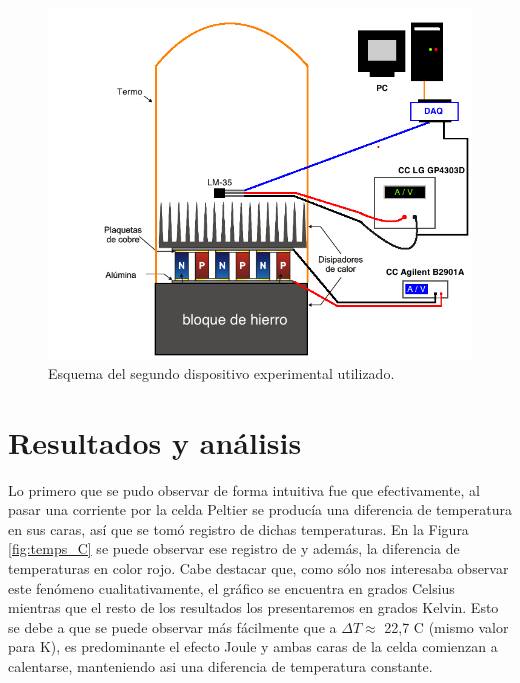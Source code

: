 \documentclass[twoside,twocolumn,a4paper]{article}
\begin{document}
\begin{figure}[H]
\includegraphics[width=\linewidth]{dispexp2.jpg}
\caption{Esquema del segundo dispositivo experimental utilizado.}
\label{fig:dispexp2}
\end{figure}


\section{Resultados y an\'alisis}

Lo primero que se pudo observar de forma intuitiva fue que efectivamente, al pasar una corriente por la celda Peltier se produc\'ia una diferencia de temperatura en sus caras, as\'i que se tom\'o registro de dichas temperaturas. En la Figura \ref{fig:temps_C} se puede observar ese registro de y adem\'as, la diferencia de temperaturas en color rojo. Cabe destacar que, como s\'olo nos interesaba observar este fen\'omeno cualitativamente, el gr\'afico se encuentra en grados Celsius mientras que el resto de los resultados los presentaremos en grados Kelvin. Esto se debe a que se puede observar m\'as f\'acilmente que a $\Delta T \approx$ 22,7 \degree C (mismo valor para \degree K), es predominante el efecto Joule y ambas caras de la celda comienzan a calentarse, manteniendo asi una diferencia de temperatura constante. 
\end{document}

